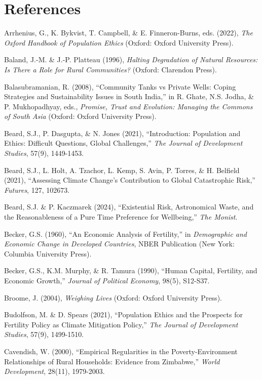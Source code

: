 \documentclass[man,11pt,a4paper,floatsintext]{apa7}
\begin{document}
\section{References}
\begin{list}{}{\setlength{\leftmargin}{0.5in}\setlength{\itemindent}{-0.5in}\setlength{\itemsep}{0pt}\setlength{\parsep}{0pt}}\linespread{2}\selectfont
\item Arrhenius, G., K. Bykvist, T. Campbell, \& E. Finneron-Burns, eds. (2022), \textit{The Oxford Handbook of Population Ethics} (Oxford: Oxford University Press).
\item Baland, J.-M. \& J.-P. Platteau (1996), \textit{Halting Degradation of Natural Resources: Is There a Role for Rural Communities?} (Oxford: Clarendon Press).
\item Balasubramanian, R. (2008), ``Community Tanks vs Private Wells: Coping Strategies and Sustainability Issues in South India,'' in R. Ghate, N.S. Jodha, \& P. Mukhopadhyay, eds., \textit{Promise, Trust and Evolution: Managing the Commons of South Asia} (Oxford: Oxford University Press).
\item Beard, S.J., P. Dasgupta, \& N. Jones (2021), ``Introduction: Population and Ethics: Difficult Questions, Global Challenges,'' \textit{The Journal of Development Studies}, 57(9), 1449-1453.
\item Beard, S.J., L. Holt, A. Tzachor, L. Kemp, S. Avin, P. Torres, \& H. Belfield (2021), ``Assessing Climate Change's Contribution to Global Catastrophic Risk,'' \textit{Futures}, 127, 102673.
\item Beard, S.J. \& P. Kaczmarek (2024), ``Existential Risk, Astronomical Waste, and the Reasonableness of a Pure Time Preference for Wellbeing,'' \textit{The Monist}.
\item Becker, G.S. (1960), ``An Economic Analysis of Fertility,'' in \textit{Demographic and Economic Change in Developed Countries}, NBER Publication (New York: Columbia University Press).
\item Becker, G.S., K.M. Murphy, \& R. Tamura (1990), ``Human Capital, Fertility, and Economic Growth,'' \textit{Journal of Political Economy}, 98(5), S12-S37.
\item Broome, J. (2004), \textit{Weighing Lives} (Oxford: Oxford University Press).
\item Budolfson, M. \& D. Spears (2021), ``Population Ethics and the Prospects for Fertility Policy as Climate Mitigation Policy,'' \textit{The Journal of Development Studies}, 57(9), 1499-1510.
\item Cavendish, W. (2000), ``Empirical Regularities in the Poverty-Environment Relationships of Rural Households: Evidence from Zimbabwe,'' \textit{World Development}, 28(11), 1979-2003.

\end{list}
\end{document}
